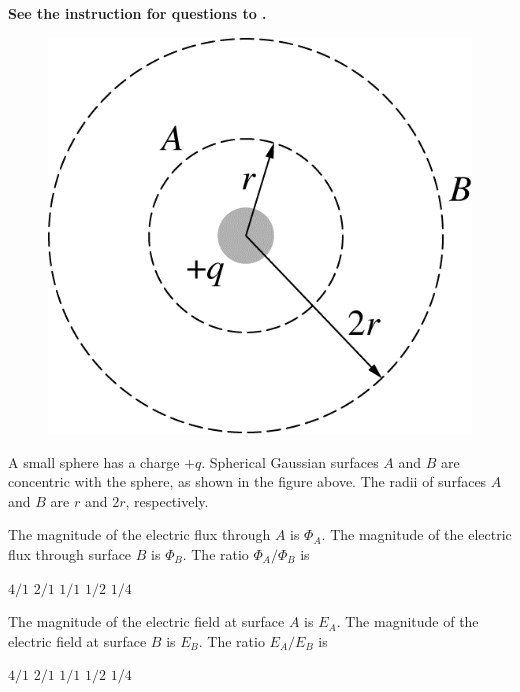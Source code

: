 \textbf{See the instruction for questions  to .}

\begin{figure}[H]
\centering
\includegraphics[scale=0.3]{images/img-003-001.png}
\end{figure}

A small sphere has a charge $+q$. Spherical Gaussian surfaces $A$ and $B$ are concentric with the sphere, as shown in the figure above. The radii of surfaces $A$ and $B$ are $r$ and $2r$, respectively.

\begin{questions}\setcounter{question}{2}\question
The magnitude of the electric flux through $A$ is $\Phi_{A}$. The magnitude of the electric flux through surface $B$ is $\Phi_{B}$. The ratio $\Phi_{A} / \Phi_{B}$ is

\begin{oneparchoices}
\choice $4 / 1$
\choice $2 / 1$
\choice $1 / 1$
\choice $1 / 2$
\choice $1 / 4$
\end{oneparchoices}\end{questions}

\begin{questions}\setcounter{question}{3}\question
The magnitude of the electric field at surface $A$ is $E_{A}$. The magnitude of the electric field at surface $B$ is $E_{B}$. The ratio $E_{A} / E_{B}$ is

\begin{oneparchoices}
\choice $4 / 1$
\choice $2 / 1$
\choice $1 / 1$
\choice $1 / 2$
\choice $1 / 4$
\end{oneparchoices}\end{questions}
